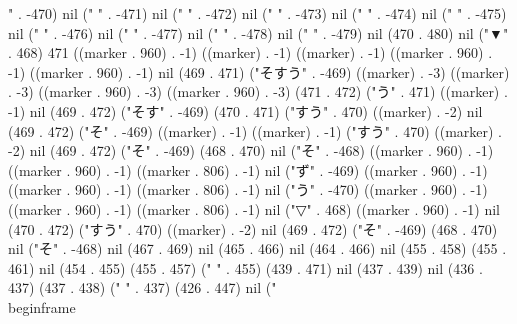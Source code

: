 {" . -470) nil (" " . -471) nil (" " . -472) nil (" " . -473) nil (" " . -474) nil (" " . -475) nil (" " . -476) nil (" " . -477) nil (" " . -478) nil (" " . -479) nil (470 . 480) nil ("▼" . 468) 471 ((marker . 960) . -1) ((marker) . -1) ((marker) . -1) ((marker . 960) . -1) ((marker . 960) . -1) nil (469 . 471) ("そすう" . -469) ((marker) . -3) ((marker) . -3) ((marker . 960) . -3) ((marker . 960) . -3) (471 . 472) ("う" . 471) ((marker) . -1) nil (469 . 472) ("そす" . -469) (470 . 471) ("すう" . 470) ((marker) . -2) nil (469 . 472) ("そ" . -469) ((marker) . -1) ((marker) . -1) ("すう" . 470) ((marker) . -2) nil (469 . 472) ("そ" . -469) (468 . 470) nil ("そ" . -468) ((marker . 960) . -1) ((marker . 960) . -1) ((marker . 806) . -1) nil ("ず" . -469) ((marker . 960) . -1) ((marker . 960) . -1) ((marker . 806) . -1) nil ("う" . -470) ((marker . 960) . -1) ((marker . 960) . -1) ((marker . 806) . -1) nil ("▽" . 468) ((marker . 960) . -1) nil (470 . 472) ("すう" . 470) ((marker) . -2) nil (469 . 472) ("そ" . -469) (468 . 470) nil ("そ" . -468) nil (467 . 469) nil (465 . 466) nil (464 . 466) nil (455 . 458) (455 . 461) nil (454 . 455) (455 . 457) ("   " . 455) (439 . 471) nil (437 . 439) nil (436 . 437) (437 . 438) ("  " . 437) (426 . 447) nil (" \\begin{frame}
 
}
